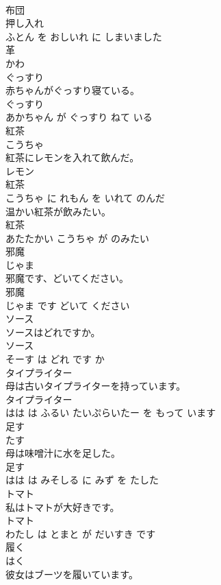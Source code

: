 \documentclass[8pt]{extreport}
\begin{document}
\begin{CJK}{UTF8}{min}
\\	布団 
\\	押し入れ 
\\	ふとん を おしいれ に しまいました			
\\	革	
\\	かわ			
\\	ぐっすり	
\\	赤ちゃんがぐっすり寝ている。	
\\	ぐっすり 
\\	あかちゃん が ぐっすり ねて いる			
\\	紅茶	
\\	こうちゃ			
\\	紅茶にレモンを入れて飲んだ。	
\\	レモン 
\\	紅茶 
\\	こうちゃ に れもん を いれて のんだ			
\\	温かい紅茶が飲みたい。	
\\	紅茶 
\\	あたたかい こうちゃ が のみたい			
\\	邪魔	
\\	じゃま			
\\	邪魔です、どいてください。	
\\	邪魔 
\\	じゃま です どいて ください			
\\	ソース	
\\	ソースはどれですか。	
\\	ソース 
\\	そーす は どれ です か			
\\	タイプライター	
\\	母は古いタイプライターを持っています。	
\\	タイプライター 
\\	はは は ふるい たいぷらいたー を もって います			
\\	足す	
\\	たす			
\\	母は味噌汁に水を足した。	
\\	足す 
\\	はは は みそしる に みず を たした			
\\	トマト	
\\	私はトマトが大好きです。	
\\	トマト 
\\	わたし は とまと が だいすき です			
\\	履く	
\\	はく			
\\	彼女はブーツを履いています。	

\end{CJK}
\end{document}
